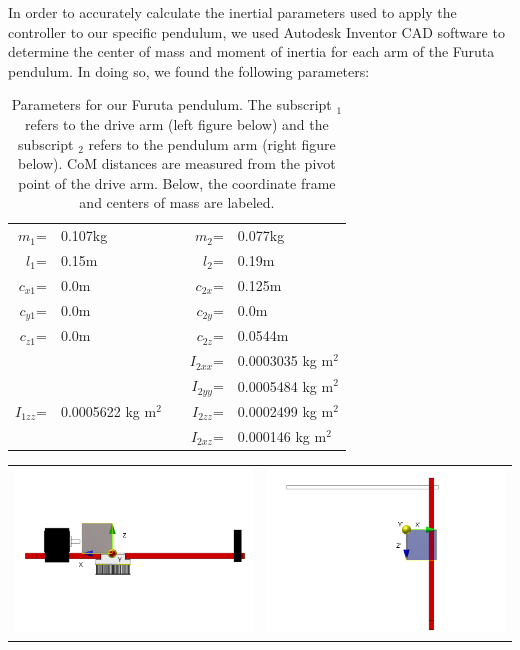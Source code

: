 \documentclass[12pt]{extarticle}
\newenvironment{sect}
  {\adjustwidth{-2.25em}{0pt}}
  {\endadjustwidth}
\begin{document}
\begin{sect}
  In order to accurately calculate the inertial parameters used to apply the controller to our specific pendulum, we used Autodesk Inventor CAD software to determine the center of mass and moment of inertia for each arm of the Furuta pendulum. In doing so, we found the following parameters:
  \begin{table}[H]
      \centering
      \begin{tabular}{r l c r l}
          $m_1$=     & 0.107kg   & \qquad & $m_2$=        & 0.077kg \\
          $l_1$=    & 0.15m          & \qquad & $l_2$=        & 0.19m\\
          $c_{x1}$=  & 0.0m      & \qquad & $c_{2x}$=     & 0.125m\\
          $c_{y1}$=  & 0.0m      & \qquad & $c_{2y}$=     & 0.0m\\
          $c_{z1}$=  & 0.0m      & \qquad & $c_{2z}$=     & 0.0544m\\
                    &           & \qquad & $I_{2xx}$=    & 0.0003035 kg m$^2$ \\
                    &           & \qquad & $I_{2yy}$=    & 0.0005484 kg m$^2$ \\
          $I_{1zz}$= & 0.0005622 kg m$^2$ & \qquad & $I_{2zz}$= & 0.0002499 kg m$^2$\\
                    &           & \qquad & $I_{2xz}$=    & 0.000146 kg m$^2$\\
      \end{tabular}
      \caption{Parameters for our Furuta pendulum. The subscript $_1$ refers to the drive arm (left figure below) and the subscript $_2$ refers to the pendulum arm (right figure below). CoM distances are measured from the pivot point of the drive arm. Below, the coordinate frame and centers of mass are labeled.}
  \end{table}
  \begin{tabular}{c c}
    \includegraphics[width=3in]{Images/ArmMotor.png}   &     \includegraphics[width=3in]{Images/ArmPendulum.png}
  \end{tabular}
  

\end{sect}
\end{document}
